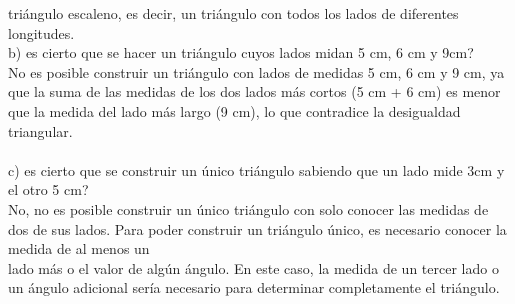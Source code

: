 \documentclass{article}
\begin{document}
triángulo escaleno, es decir, un triángulo con todos los lados de diferentes longitudes.\\
b) es cierto que se hacer un triángulo cuyos lados midan 5 cm, 6 cm y 9cm?\\
No es posible construir un triángulo con lados de medidas 5 cm, 6 cm y 9 cm, ya que la suma de las medidas de los dos lados más cortos (5 cm + 6 cm) es menor que la medida del lado más largo (9 cm), lo que contradice la desigualdad triangular.\\
\\
c) es cierto que se construir un único triángulo sabiendo que un lado mide 3cm y el otro 5 cm?\\
No, no es posible construir un único triángulo con solo conocer las medidas de dos de sus lados. Para poder construir un triángulo único, es necesario conocer la medida de al menos un\\
lado más o el valor de algún ángulo. En este caso, la medida de un tercer lado o un ángulo adicional sería necesario para determinar completamente el triángulo.\\
\\
\end{document}
